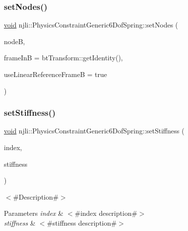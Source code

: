 \subsubsection{\texorpdfstring{set\+Nodes()}{setNodes()}\hspace{0.1cm}{\footnotesize\ttfamily [2/2]}}
{\footnotesize\ttfamily \mbox{\hyperlink{_thread_8h_af1e856da2e658414cb2456cb6f7ebc66}{void}} njli\+::\+Physics\+Constraint\+Generic6\+Dof\+Spring\+::set\+Nodes (\begin{DoxyParamCaption}\item[{\mbox{\hyperlink{classnjli_1_1_node}{Node}} $\ast$}]{nodeB,  }\item[{const bt\+Transform \&}]{frame\+InB = {\ttfamily btTransform\+:\+:getIdentity()},  }\item[{bool}]{use\+Linear\+Reference\+FrameB = {\ttfamily true} }\end{DoxyParamCaption})}

\mbox{\label{classnjli_1_1_physics_constraint_generic6_dof_spring_a21ba981d8b8c8a7ea383e99c94ecf2e0}} 
\subsubsection{\texorpdfstring{set\+Stiffness()}{setStiffness()}}
{\footnotesize\ttfamily \mbox{\hyperlink{_thread_8h_af1e856da2e658414cb2456cb6f7ebc66}{void}} njli\+::\+Physics\+Constraint\+Generic6\+Dof\+Spring\+::set\+Stiffness (\begin{DoxyParamCaption}\item[{int}]{index,  }\item[{\mbox{\hyperlink{_util_8h_a5f6906312a689f27d70e9d086649d3fd}{f32}}}]{stiffness }\end{DoxyParamCaption})}

$<$\#\+Description\#$>$


\begin{DoxyParams}{Parameters}
{\em index} & $<$\#index description\#$>$ \\
\hline
{\em stiffness} & $<$\#stiffness description\#$>$ \\
\hline
\end{DoxyParams}
\mbox{\label{classnjli_1_1_physics_constraint_generic6_dof_spring_a26622b5bceef3e66e0a3b9f5ac3f60b2}} 
